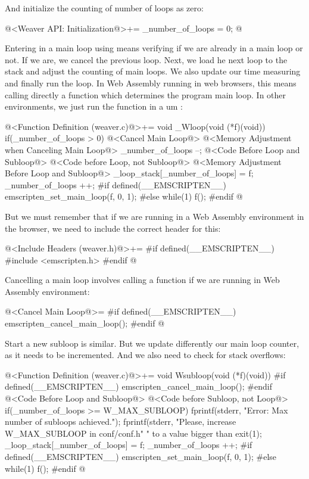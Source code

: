 And initialize the counting of number of loops as zero:

\iniciocodigo
@<Weaver API: Initialization@>+=
_number_of_loops = 0;
@
\fimcodigo

Entering in a main loop using  means verifying if we
are already in a main loop or not. If we are, we cancel the previous
loop. Next, we load he next loop to the stack and adjust the counting
of main loops. We also update our time measuring and finally run the
loop. In Web Assembly running in web browsers, this means calling
directly a function which determines the program main loop. In other
environments, we just run the function in a um :

\iniciocodigo
@<Function Definition (weaver.c)@>+=
void _Wloop(void (*f)(void)){
  if(_number_of_loops > 0){
    @<Cancel Main Loop@>
    @<Memory Adjustment when Canceling Main Loop@>
    _number_of_loops --;
  }
  @<Code Before Loop and Subloop@>
  @<Code before Loop, not Subloop@>
  @<Memory Adjustment Before Loop and Subloop@>
  _loop_stack[_number_of_loops] = f;
  _number_of_loops ++;
#if defined(__EMSCRIPTEN__)
  emscripten_set_main_loop(f, 0, 1);
#else
  while(1)
    f();
#endif
}
@
\fimcodigo

But we must remember that if we are running in a Web Assembly
environment in the browser, we need to include the correct header for
this:

\iniciocodigo
@<Include Headers (weaver.h)@>+=
#if defined(__EMSCRIPTEN__)
#include <emscripten.h>
#endif
@
\fimcodigo


Cancelling a main loop involves calling a function if we are running
in Web Assembly environment:

\iniciocodigo
@<Cancel Main Loop@>=
#if defined(__EMSCRIPTEN__)
emscripten_cancel_main_loop();
#endif
@
\fimcodigo

Start a new subloop is similar. But we update differently our main
loop counter, as it needs to be incremented. And we also need to check
for stack overflows:

\iniciocodigo
@<Function Definition (weaver.c)@>+=
void Wsubloop(void (*f)(void)){
#if defined(__EMSCRIPTEN__)
    emscripten_cancel_main_loop();
#endif
  @<Code Before Loop and Subloop@>
  @<Code before Subloop, not Loop@>
  if(_number_of_loops >= W_MAX_SUBLOOP){
    fprintf(stderr, "Error: Max number of subloops achieved.\n");
    fprintf(stderr, "Please, increase W_MAX_SUBLOOP in conf/conf.h"
            " to a value bigger than %
    exit(1);
  }
  _loop_stack[_number_of_loops] = f;
  _number_of_loops ++;
#if defined(__EMSCRIPTEN__)
  emscripten_set_main_loop(f, 0, 1);
#else
  while(1)
    f();
#endif
}
@
\fimcodigo



